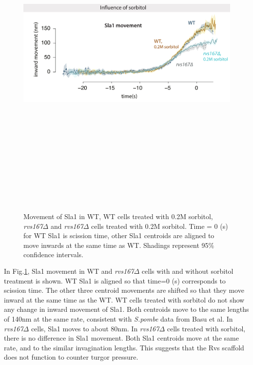 	\vspace{2mm}
		\begin{figure}[H]
			\hspace{-0.5cm}
		\centering
		\includegraphics[width=15cm,height=17cm,keepaspectratio]{figures/results_final/sorbitol2}
		\caption[Effect of sorbitol on \textit{rvs167$\Delta$} cells]
		{Movement of Sla1 in WT, WT cells treated with 0.2M sorbitol, \textit{rvs167$\Delta$} and \textit{rvs167$\Delta$} cells treated with 0.2M sorbitol. Time = 0 (s) for WT Sla1 is scission time, other Sla1 centroids are aligned to move inwards at the same time as WT. Shadings represent 95\% confidence intervals.
			\label{fig_sorbitol}}
		
	\end{figure}

In Fig.\ref{fig_sorbitol}, Sla1 movement in WT and \textit{rvs167$\Delta$} cells with and without sorbitol treatment is shown. WT Sla1 is aligned so that time=0 (s) corresponds to scission time. The other three centroid movements are shifted so that they move inward at the same time as the WT. WT cells treated with sorbitol do not show any change in inward movement of Sla1. Both centroids move to the same lengths of 140nm at the same rate, consistent with \textit{S.pombe} data from Basu et al. In \textit{rvs167$\Delta$} cells, Sla1 moves to about 80nm. In \textit{rvs167$\Delta$} cells treated with sorbitol, there is no difference in Sla1 movement. Both Sla1 centroids move at the same rate, and to the similar invagination lengths. This suggests that the Rvs scaffold does not function to counter turgor pressure.  



